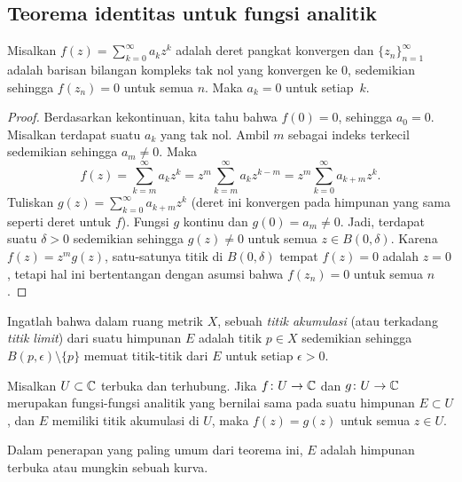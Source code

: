\subsection{Teorema identitas untuk fungsi analitik}

\begin{lemma}
Misalkan $f(z) = \sum_{k=0}^\infty a_k z^k$ adalah deret pangkat konvergen dan
$\{ z_n \}_{n=1}^\infty$ adalah barisan bilangan kompleks tak nol yang konvergen ke 0,
sedemikian sehingga $f(z_n) = 0$ untuk semua $n$.  Maka $a_k = 0$ untuk setiap~$k$.
\end{lemma}

\begin{proof}
Berdasarkan kekontinuan, kita tahu bahwa $f(0) = 0$, sehingga $a_0 = 0$.
Misalkan terdapat suatu $a_k$ yang tak nol.
Ambil $m$ sebagai indeks terkecil sedemikian sehingga $a_m \neq 0$.  Maka
\begin{equation*}
f(z) = \sum_{k=m}^\infty a_k z^k = 
z^m \sum_{k=m}^\infty a_k z^{k-m} =
z^m \sum_{k=0}^\infty a_{k+m} z^{k} .
\end{equation*}
Tuliskan $g(z) = \sum_{k=0}^\infty a_{k+m} z^{k}$ (deret ini konvergen
pada himpunan yang sama seperti deret untuk $f$).  Fungsi $g$ kontinu dan
$g(0) = a_m \neq 0$.  Jadi, terdapat suatu $\delta > 0$ sedemikian sehingga
$g(z) \neq 0$ untuk semua $z \in B(0,\delta)$.  Karena $f(z) = z^m g(z)$,
satu-satunya titik di $B(0,\delta)$ tempat $f(z) = 0$ adalah $z=0$, tetapi hal
ini bertentangan dengan asumsi bahwa $f(z_n) = 0$ untuk semua $n$.
\end{proof}

Ingatlah bahwa dalam ruang metrik $X$, sebuah \emph{titik akumulasi}
(atau terkadang \emph{titik limit}) dari suatu himpunan
$E$ adalah titik $p \in X$ sedemikian sehingga
$B(p,\epsilon) \setminus \{ p \}$ memuat titik-titik dari $E$
untuk setiap $\epsilon > 0$.

\begin{thm}
\label{thm:identityanalytic}%
%
Misalkan $U \subset {\mathbb{C}}$ terbuka dan terhubung.  Jika $f \colon U \to {\mathbb{C}}$
dan $g \colon U \to {\mathbb{C}}$ merupakan fungsi-fungsi analitik yang bernilai
sama pada suatu himpunan $E \subset U$, dan $E$ memiliki titik akumulasi
di $U$, maka $f(z) = g(z)$ untuk semua $z \in U$.
\end{thm}

Dalam penerapan yang paling umum dari teorema ini, $E$ adalah himpunan terbuka
atau mungkin sebuah kurva.

